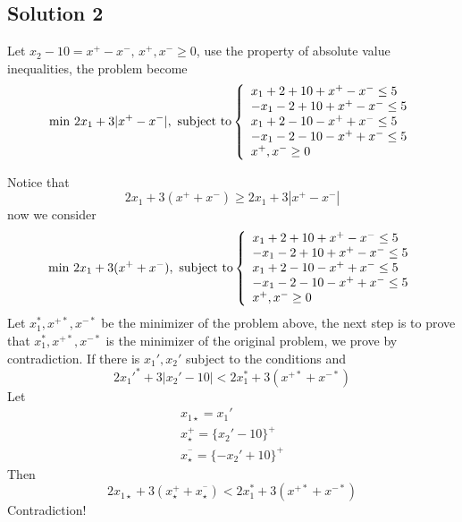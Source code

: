 \documentclass{article}
\begin{document}
\subsection{Solution 2}
Let $x_2-10=x^+-x^-,\, x^+,x^-\geq 0$, use the property of absolute value inequalities, the problem become
\begin{equation}  
\min \, 2x_1+3|x^+-x^-|, \textnormal{ subject to}
\left\{  
             \begin{array}{ll}
             x_1+2+10+x^+-x^-\leq 5\\
             -x_1-2+10+x^+-x^-\leq 5\\
             x_1+2-10-x^++x^-\leq 5\\
             -x_1-2-10-x^++x^-\leq 5\\
             x^+,x^-\geq 0
             \end{array}  
\right.  
\end{equation}  

Notice that 
\begin{equation}  
2x_1+3(x^++x^-) \geq 2x_1+3|x^+-x^-|
\end{equation}  
now we consider 
\begin{equation}  
\min \,2x_1+3(x^++x^-) , \textnormal{ subject to}
\left\{  
             \begin{array}{ll}
             x_1+2+10+x^+-x^-\leq 5\\
             -x_1-2+10+x^+-x^-\leq 5\\
             x_1+2-10-x^++x^-\leq 5\\
             -x_1-2-10-x^++x^-\leq 5\\
             x^+,x^-\geq 0
             \end{array}  
\right.  
\end{equation}  
Let $x_1^*,x^{+*},x^{-*}$ be the minimizer of the problem above, the next step is to prove that  $x_1^*,x^{+*},x^{-*}$ is the minimizer of the original problem, we prove by contradiction.
If there is $x_1',x_2'$ subject to the conditions and 
\begin{equation}  
2x_1'^*+3|x_2'-10| < 2x_1^*+3(x^{+*}+x^{-*})
\end{equation}  
Let 
\begin{eqnarray*}  
x_{1\star}=x_1'\\
x^{+}_\star=\{x_2'-10\}^+\\
x^{^-}_\star=\{-x_2'+10\}^+
\end{eqnarray*}  
Then 
\begin{equation}  
2x_{1\star}+3(x^{+}_\star+x^{^-}_\star) < 2x_1^*+3(x^{+*}+x^{-*})
\end{equation}  
Contradiction!
\end{document}
